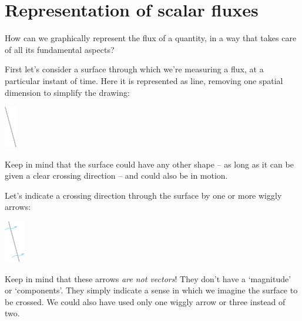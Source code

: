\documentclass[a4paper,12pt,%
onecolumn,oneside,%
british%
]{memoir}
\renewcommand*{\|}[1][]{\nonscript\:#1\vert\nonscript\:\mathopen{}}
\begin{document}
\section{Representation of scalar fluxes}
\label{sec:flux_scalar_representation}


How can we graphically represent the flux of a quantity, in a way that takes care of all its fundamental aspects?

First let's consider a surface through which we're measuring a flux, at a particular instant of time. Here it is represented as line, removing one spatial dimension to simplify the drawing:\noprelistbreak
\begin{center}
  \medskip
  \includegraphics[height=5em]{images/surface_tilted_nocross.jpg}
\end{center}
Keep in mind that the surface could have any other shape -- as long as it can be given a clear crossing direction -- and could also be in motion.

Let's indicate a crossing direction through the surface by one or more wiggly arrows:\noprelistbreak
\begin{center}
  \medskip
  \includegraphics[height=5em]{images/surface_tilted_crossing.jpg}
\end{center}
Keep in mind that these arrows \emph{are not vectors}! They don't have a \enquote*{magnitude} or \enquote*{components}. They simply indicate a sense in which we imagine the surface to be crossed. We could also have used only one wiggly arrow or three instead of two.
\end{document}
